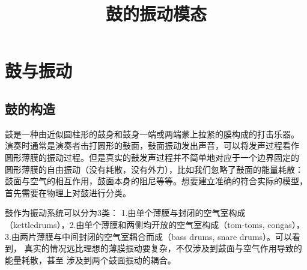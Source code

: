 \documentclass[a4paper]{ctexart}
\title{\textbf{鼓的振动模态}}
\author{}
\date{}
\begin{document}
	\pagestyle{fancy}
	\pagestyle{fancy}
	\chead{}
	\rhead{\today}
	\maketitle
	\thispagestyle{fancy}
	\section{鼓与振动}
	\subsection{鼓的构造}
	鼓是一种由近似圆柱形的鼓身和鼓身一端或两端蒙上拉紧的膜构成的打击乐器。
	演奏时通常是演奏者击打圆形的鼓面，鼓面振动发出声音，可以将发声过程看作
	圆形薄膜的振动过程。但是真实的鼓发声过程并不简单地对应于一个边界固定的
	圆形薄膜的自由振动（没有耗散，没有外力），比如我们忽略了鼓面的能量耗散：
	鼓面与空气的相互作用，鼓面本身的阻尼等等。想要建立准确的符合实际的模型，
	首先需要在物理上对鼓进行分类。
	\par 鼓作为振动系统可以分为3类\cite{a}：
	1.由单个薄膜与封闭的空气室构成（kettledrums），2.由单个薄膜和两侧均开放的空气室构成（tom-toms, congas），
	3.由两片薄膜与中间封闭的空气室耦合而成（bass drums, snare drums）。可以看到，
	真实的情况远比理想的薄膜振动要复杂，不仅涉及到鼓面与空气作用导致的能量耗散，甚至
	涉及到两个鼓面振动的耦合。
\end{document}
